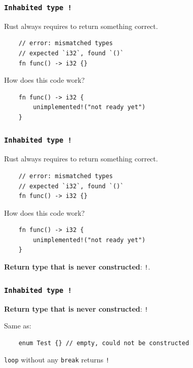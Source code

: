 \documentclass[aspectratio=1610,t]{beamer}
\begin{document}

\begin{frame}[fragile]
\frametitle{\texttt{Inhabited type \texttt{!}}}
Rust always requires to return something correct.

\begin{verbatim}
    // error: mismatched types
    // expected `i32`, found `()`
    fn func() -> i32 {}
\end{verbatim}

How does this code work?

\begin{verbatim}
    fn func() -> i32 {
        unimplemented!("not ready yet")
    }
\end{verbatim}
\end{frame}


\begin{frame}[fragile]
\frametitle{\texttt{Inhabited type \texttt{!}}}
Rust always requires to return something correct.

\begin{verbatim}
    // error: mismatched types
    // expected `i32`, found `()`
    fn func() -> i32 {}
\end{verbatim}

How does this code work?

\begin{verbatim}
    fn func() -> i32 {
        unimplemented!("not ready yet")
    }
\end{verbatim}

\textbf{Return type that is never constructed}: \texttt{!}.
\end{frame}


\begin{frame}[fragile]
\frametitle{\texttt{Inhabited type \texttt{!}}}
\textbf{Return type that is never constructed}: \texttt{!}

Same as:

\begin{verbatim}
    enum Test {} // empty, could not be constructed
\end{verbatim}

\texttt{loop} without any \texttt{break} returns \texttt{!}
\end{frame}
\end{document}
